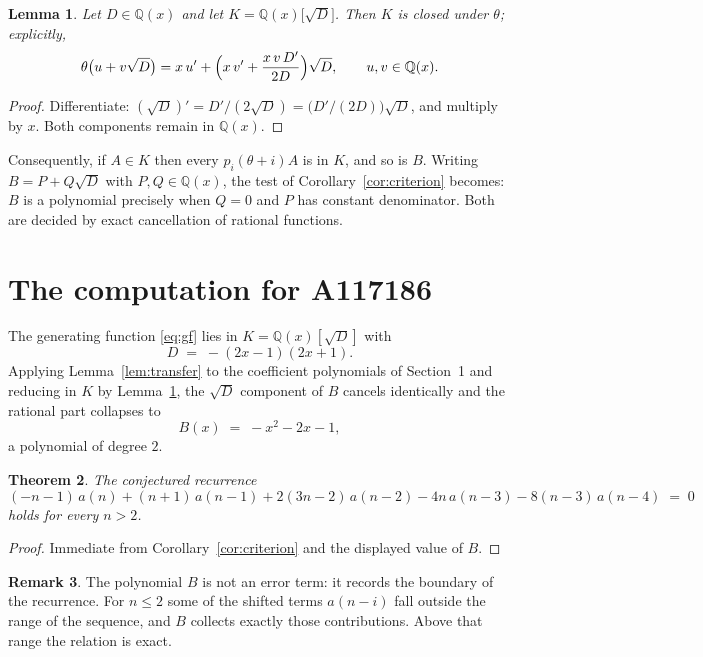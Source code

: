 \documentclass[11pt,a4paper]{article}
\theoremstyle{plain}
\newtheorem{theorem}{Theorem}
\newtheorem{lemma}[theorem]{Lemma}
\theoremstyle{definition}
\newtheorem{remark}[theorem]{Remark}
\begin{document}
\begin{lemma}\label{lem:field}
Let $D\in\mathbb{Q}(x)$ and let $K=\mathbb{Q}(x)\bigl[\sqrt{D}\bigr]$. Then $K$ is closed
under $\theta$; explicitly,
\[
\theta\bigl(u+v\sqrt{D}\bigr)=x\,u'+\Bigl(x\,v'+\frac{x\,v\,D'}{2D}\Bigr)\sqrt{D},
\qquad u,v\in\mathbb{Q}(x).
\]
\end{lemma}

\begin{proof}
Differentiate: $(\sqrt{D})'=D'/(2\sqrt{D})=\bigl(D'/(2D)\bigr)\sqrt{D}$, and multiply by
$x$. Both components remain in $\mathbb{Q}(x)$.
\end{proof}

Consequently, if $A\in K$ then every $p_{i}(\theta+i)A$ is in $K$, and so is $B$. Writing
$B=P+Q\sqrt{D}$ with $P,Q\in\mathbb{Q}(x)$, the test of Corollary~\ref{cor:criterion}
becomes: $B$ is a polynomial precisely when $Q=0$ and $P$ has constant denominator. Both
are decided by exact cancellation of rational functions.

\section{The computation for A117186}

The generating function \eqref{eq:gf} lies in $K=\mathbb{Q}(x)[\sqrt{D}]$ with
\[
D \;=\; - \left(2 x - 1\right) \left(2 x + 1\right) .
\]
Applying Lemma~\ref{lem:transfer} to the coefficient polynomials of Section~1 and reducing
in $K$ by Lemma~\ref{lem:field}, the $\sqrt{D}$ component of $B$ cancels identically and
the rational part collapses to
\[
B(x)\;=\;- x^{2} - 2 x - 1 ,
\]
a polynomial of degree $2$.

\begin{theorem}
The conjectured recurrence
\[
(- n - 1)\,a(n) + (n + 1)\,a(n-1) + 2 \left(3 n - 2\right)\,a(n-2) -  4 n\,a(n-3) -  8 \left(n - 3\right)\,a(n-4) \;=\;0
\]
holds for every $n>2$.
\end{theorem}

\begin{proof}
Immediate from Corollary~\ref{cor:criterion} and the displayed value of $B$.
\end{proof}

\begin{remark}
The polynomial $B$ is not an error term: it records the boundary of the recurrence. For
$n\le2$ some of the shifted terms $a(n-i)$ fall outside the range of the sequence,
and $B$ collects exactly those contributions. Above that range the relation is exact.
\end{remark}
\end{document}
